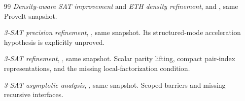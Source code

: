 \begin{thebibliography}{99}
\emph{Density-aware SAT improvement} and \emph{ETH density refinement},
 and
, same ProveIt snapshot.

\emph{3-SAT precision refinement},
, same snapshot.
Its structured-mode acceleration hypothesis is explicitly unproved.

\emph{3-SAT refinement},
,
same snapshot. Scalar parity lifting, compact pair-index representations,
and the missing local-factorization condition.

\emph{3-SAT asymptotic analysis},
, same snapshot.
Scoped barriers and missing recursive interfaces.
\end{thebibliography}

